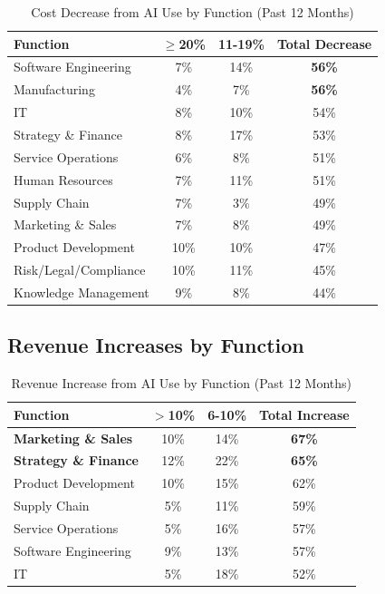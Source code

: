 \begin{table}[htbp]
\centering
\caption{Cost Decrease from AI Use by Function (Past 12 Months)}
\label{tab:vvv1-cost}
\renewcommand{\arraystretch}{1.3}
\begin{tabular}{@{}lccc@{}}
\toprule
\textbf{Function} & \textbf{$\geq$20\%} & \textbf{11-19\%} & \textbf{Total Decrease} \\
\midrule
Software Engineering & 7\% & 14\% & \textbf{56\%} \\
Manufacturing & 4\% & 7\% & \textbf{56\%} \\
IT & 8\% & 10\% & 54\% \\
Strategy \& Finance & 8\% & 17\% & 53\% \\
Service Operations & 6\% & 8\% & 51\% \\
Human Resources & 7\% & 11\% & 51\% \\
Supply Chain & 7\% & 3\% & 49\% \\
Marketing \& Sales & 7\% & 8\% & 49\% \\
Product Development & 10\% & 10\% & 47\% \\
Risk/Legal/Compliance & 10\% & 11\% & 45\% \\
Knowledge Management & 9\% & 8\% & 44\% \\
\bottomrule
\end{tabular}
\end{table}


\subsection{Revenue Increases by Function}

\begin{table}[htbp]
\centering
\caption{Revenue Increase from AI Use by Function (Past 12 Months)}
\label{tab:vvv1-revenue}
\renewcommand{\arraystretch}{1.3}
\begin{tabular}{@{}lccc@{}}
\toprule
\textbf{Function} & \textbf{$>$10\%} & \textbf{6-10\%} & \textbf{Total Increase} \\
\midrule
\textbf{Marketing \& Sales} & 10\% & 14\% & \textbf{67\%} \\
\textbf{Strategy \& Finance} & 12\% & 22\% & \textbf{65\%} \\
Product Development & 10\% & 15\% & 62\% \\
Supply Chain & 5\% & 11\% & 59\% \\
Service Operations & 5\% & 16\% & 57\% \\
Software Engineering & 9\% & 13\% & 57\% \\
IT & 5\% & 18\% & 52\% \\
\bottomrule
\end{tabular}
\end{table}


